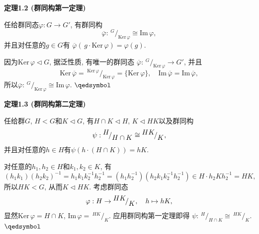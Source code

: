 \documentclass[UTF8]{ctexart}
\begin{document}
\vspace{15pt}

\hypertarget{sec:定理1.2}{}
\noindent\textbf{定理1.2 (群同构第一定理)}

任给群同态$\varphi:G\to G'$, 有群同构
\[
    \overline{\varphi}:\,\!^{\displaystyle G}\!
    /_{\displaystyle\mathrm{Ker}\,\varphi}\cong\mathrm{Im}\,\varphi,
\]
并且对任意的$g\in G$有
$\overline{\varphi}(\,g\cdot\mathrm{Ker}\,\varphi)=\varphi(g)$.


因为$\mathrm{Ker}\,\varphi\lhd G$, 据泛性质, 有唯一的群同态
$\overline{\varphi}:\,\!^{\displaystyle G}\!
/_{\displaystyle\mathrm{Ker}\,\varphi}\to G'$, 并且
\vspace{3pt}
\[
    \mathrm{Ker}\,\overline{\varphi}=\,\!^{\displaystyle\mathrm{Ker}\,\varphi}\!
    /_{\displaystyle\mathrm{Ker}\,\varphi}=\{\mathrm{Ker}\,\varphi\},\quad
    \mathrm{Im}\,\overline{\varphi}=\mathrm{Im}\,\overline{\varphi},
\]
所以$\overline{\varphi}:\,\!^{\displaystyle G}\!
/_{\displaystyle\mathrm{Ker}\,\varphi}\cong\mathrm{Im}\,\varphi$.
\hfill $\qedsymbol$

\vspace{15pt}

\hypertarget{sec:定理1.3}{}
\noindent\textbf{定理1.3 (群同构第二定理)}

任给群$G$, $H<G$和$K\lhd G$, 有$H\cap K\lhd H$, $K\lhd HK$以及群同构
\vspace{3pt}
\[
    \psi:\,\!^{\displaystyle H}\!/_{\displaystyle H\cap K}
    \cong\,\!^{\displaystyle HK}\!/_{\displaystyle K},\\[3pt]
\]
并且对任意的$h\in H$有$\psi(h\cdot(H\cap K))=hK$.


对任意的$h_1,h_2\in H$和$k_1,k_2\in K$, 有
\[
    (h_1k_1)(h_2k_2)^{-1}=h_1k_1k_2^{-1}h_2^{-1}=
    (h_1h_2^{-1})(h_2k_1k_2^{-1}h_2^{-1})\in H\cdot h_2Kh_2^{-1}=HK,
\]
所以$HK<G$, 从而$K\lhd HK$. 考虑群同态
\[
    \varphi:H\to\,\!^{\displaystyle HK}\!/_{\displaystyle K},
    \quad h\mapsto hK,\\[3pt]
\]
显然$\mathrm{Ker}\,\varphi=H\cap K$, $\mathrm{Im}\,\varphi=
\,\!^{\displaystyle HK}\!/_{\displaystyle K}$. 应用群同构第一定理即得
$\psi:\,\!^{\displaystyle H}\!/_{\displaystyle H\cap K}
\cong\,\!^{\displaystyle HK}\!/_{\displaystyle K}$. \hfill $\qedsymbol$





\newpage
\end{document}
